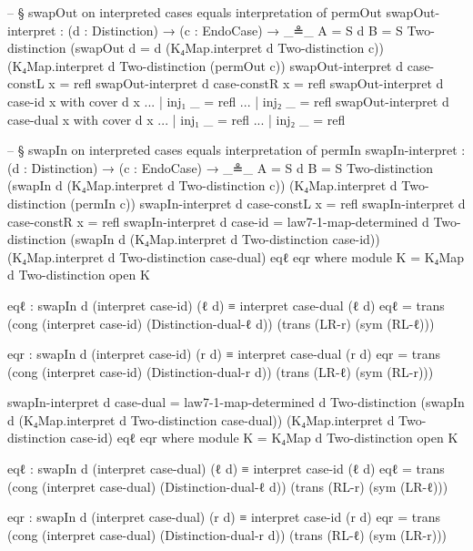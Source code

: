 \documentclass[11pt,a4paper]{book}
\begin{document}
\begin{code}
-- § swapOut on interpreted cases equals interpretation of permOut
swapOut-interpret :
  (d : Distinction) →
  (c : EndoCase) →
  _≗_ {A = S d} {B = S Two-distinction}
    (swapOut {d = d} (K₄Map.interpret d Two-distinction c))
    (K₄Map.interpret d Two-distinction (permOut c))
swapOut-interpret d case-constL x = refl
swapOut-interpret d case-constR x = refl
swapOut-interpret d case-id x with cover d x
... | inj₁ _ = refl
... | inj₂ _ = refl
swapOut-interpret d case-dual x with cover d x
... | inj₁ _ = refl
... | inj₂ _ = refl

-- § swapIn on interpreted cases equals interpretation of permIn
swapIn-interpret :
  (d : Distinction) →
  (c : EndoCase) →
  _≗_ {A = S d} {B = S Two-distinction}
    (swapIn d (K₄Map.interpret d Two-distinction c))
    (K₄Map.interpret d Two-distinction (permIn c))
swapIn-interpret d case-constL x = refl
swapIn-interpret d case-constR x = refl
swapIn-interpret d case-id =
  law7-1-map-determined d Two-distinction
    (swapIn d (K₄Map.interpret d Two-distinction case-id))
    (K₄Map.interpret d Two-distinction case-dual)
    eqℓ
    eqr
  where
    module K = K₄Map d Two-distinction
    open K

    eqℓ : swapIn d (interpret case-id) (ℓ d) ≡ interpret case-dual (ℓ d)
    eqℓ =
      trans
        (cong (interpret case-id) (Distinction-dual-ℓ d))
        (trans
          (LR-r)
          (sym (RL-ℓ)))

    eqr : swapIn d (interpret case-id) (r d) ≡ interpret case-dual (r d)
    eqr =
      trans
        (cong (interpret case-id) (Distinction-dual-r d))
        (trans
          (LR-ℓ)
          (sym (RL-r)))

swapIn-interpret d case-dual =
  law7-1-map-determined d Two-distinction
    (swapIn d (K₄Map.interpret d Two-distinction case-dual))
    (K₄Map.interpret d Two-distinction case-id)
    eqℓ
    eqr
  where
    module K = K₄Map d Two-distinction
    open K

    eqℓ : swapIn d (interpret case-dual) (ℓ d) ≡ interpret case-id (ℓ d)
    eqℓ =
      trans
        (cong (interpret case-dual) (Distinction-dual-ℓ d))
        (trans
          (RL-r)
          (sym (LR-ℓ)))

    eqr : swapIn d (interpret case-dual) (r d) ≡ interpret case-id (r d)
    eqr =
      trans
        (cong (interpret case-dual) (Distinction-dual-r d))
        (trans
          (RL-ℓ)
          (sym (LR-r)))
\end{code}
\end{document}
